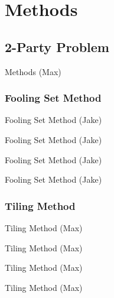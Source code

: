 \documentclass{beamer}
\begin{document}
\section{Methods}

\subsection{2-Party Problem}

\begin{frame}{Methods (Max)}

\end{frame}

\subsubsection{Fooling Set Method}

\begin{frame}{Fooling Set Method (Jake)}

\end{frame}

\begin{frame}{Fooling Set Method (Jake)}

\end{frame}

\begin{frame}{Fooling Set Method (Jake)}

\end{frame}

\begin{frame}{Fooling Set Method (Jake)}

\end{frame}

\subsubsection{Tiling Method}

\begin{frame}{Tiling Method (Max)}

\end{frame}

\begin{frame}{Tiling Method (Max)}

\end{frame}

\begin{frame}{Tiling Method (Max)}

\end{frame}

\begin{frame}{Tiling Method (Max)}

\end{frame}
\end{document}
